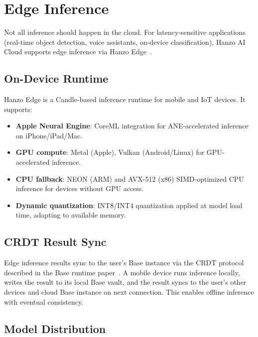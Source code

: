 \section{Edge Inference}

\label{sec:edge}

Not all inference should happen in the cloud. For latency-sensitive
applications (real-time object detection, voice assistants, on-device
classification), Hanzo AI Cloud supports edge inference via Hanzo
Edge~\cite{hanzoedge}.

\subsection{On-Device Runtime}

Hanzo Edge is a Candle-based inference runtime for mobile and IoT devices. It
supports:

\begin{itemize}[leftmargin=1.1em]
    \item \textbf{Apple Neural Engine}: CoreML integration for ANE-accelerated
    inference on iPhone/iPad/Mac.
    \item \textbf{GPU compute}: Metal (Apple), Vulkan (Android/Linux) for
    GPU-accelerated inference.
    \item \textbf{CPU fallback}: NEON (ARM) and AVX-512 (x86) SIMD-optimized
    CPU inference for devices without GPU access.
    \item \textbf{Dynamic quantization}: INT8/INT4 quantization applied at
    model load time, adapting to available memory.
\end{itemize}

\subsection{CRDT Result Sync}

Edge inference results sync to the user's Base instance via the CRDT protocol
described in the Base runtime paper~\cite{hanzobaseruntime}. A mobile device
runs inference locally, writes the result to its local Base vault, and the
result syncs to the user's other devices and cloud Base instance on next
connection. This enables offline inference with eventual consistency.

\subsection{Model Distribution}

